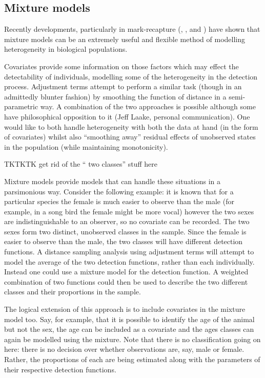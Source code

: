 \subsection{Mixture models}
Recently developments, particularly in mark-recapture (\cite{pledger2000}, \cite{dorazio03}, \cite{pledger2005} and \cite{morgan08}) have shown that mixture models can be an extremely useful and flexible method of modelling heterogeneity in biological populations.

Covariates provide some information on those factors which may effect the detectability of individuals, modelling some of the heterogeneity in the detection process. Adjustment terms attempt to perform a similar task (though in an admittedly blunter fashion) by smoothing the function of distance in a semi-parametric way. A combination of the two approaches is possible although some have philosophical opposition to it (Jeff Laake, personal communication). One would like to both handle heterogeneity with both the data at hand (in the form of covariates) whilst also ``smoothing away'' residual effects of unobserved states in the population (while maintaining monotonicity).


TKTKTK get rid of the `` two classes'' stuff here

Mixture models provide models that can handle these situations in a parsimonious way. Consider the following example: it is known that for a particular species the female is much easier to observe than the male (for example, in a song bird the female might be more vocal) however the two sexes are indistinguishable to an observer, so no covariate can be recorded. The two sexes form two distinct, unobserved classes in the sample. Since the female is easier to observe than the male, the two classes will have different detection functions. A distance sampling analysis using adjustment terms will attempt to model the average of the two detection functions, rather than each individually. Instead one could use a mixture model for the detection function. A weighted combination of two functions could then be used to describe the two different classes and their proportions in the sample. 

The logical extension of this approach is to include covariates in the mixture model too. Say, for example, that it is possible to identify the age of the animal but not the sex, the age can be included as a covariate and the ages classes can again be modelled using the mixture. Note that there is no classification going on here: there is no decision over whether observations are, say, male or female. Rather, the proportions of each are being estimated along with the parameters of their respective detection functions.

